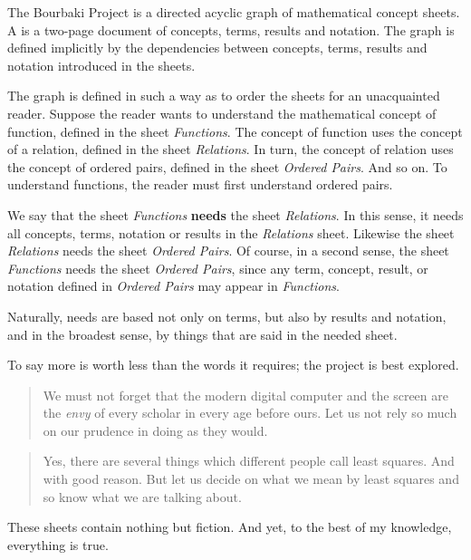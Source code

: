 
The Bourbaki Project is a directed acyclic graph of
mathematical concept sheets.
A  is a two-page document of
concepts, terms, results and notation.
The graph is defined implicitly by
the dependencies between concepts, terms,
results and notation introduced in the sheets.

The graph is defined in such a way as to
order the sheets for an unacquainted reader.
Suppose the reader wants to understand the
mathematical concept of function, defined
in the sheet \textit{Functions}.
The concept of function uses the concept of a
relation,
defined in the sheet \textit{Relations}.
In turn, the concept of relation uses the
concept of ordered pairs, defined in
the sheet \textit{Ordered Pairs}.
And so on.
To understand functions, the reader must
first understand ordered pairs.

We say that the sheet \textit{Functions}
\textbf{needs} the sheet \textit{Relations}.
In this sense, it needs all concepts,
terms, notation or results in the
\textit{Relations} sheet.
Likewise the sheet \textit{Relations}
needs the sheet \textit{Ordered Pairs}.
Of course, in a second sense, the sheet
\textit{Functions} needs the sheet
\textit{Ordered Pairs},
since any term, concept,
result, or notation defined in
\textit{Ordered Pairs} may appear in
\textit{Functions}.

Naturally, needs are based not only
on terms, but also by results and notation,
and in the broadest sense, by things that are said in the
needed sheet.
\clearpage

To say more is worth less than the words it requires;
the project is best explored.

\begin{quote}
We must not forget that the
modern digital computer and
the screen are the \textit{envy} of
every scholar in every age
before ours. Let us not rely
so much
on our prudence in doing
as they would.
\end{quote}

\begin{quote}
Yes, there are several things
which different people call
least squares. And with good
reason. But let us decide on
what we mean by least squares
and so know what we are talking
about.
\end{quote}

These sheets contain nothing
but fiction. And yet, to the best
of my knowledge, everything
is true.
